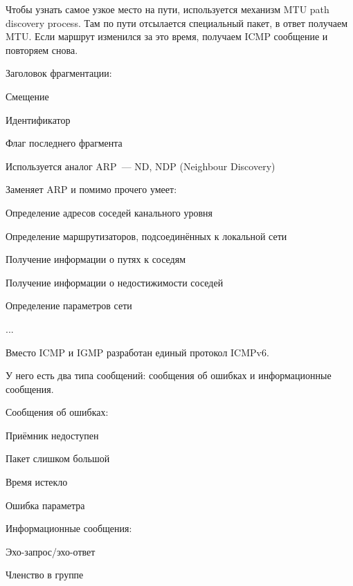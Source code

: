 Чтобы узнать самое узкое место на пути, используется механизм MTU path discovery process. Там по пути отсылается специальный пакет, в ответ получаем MTU. Если маршрут изменился за это время, получаем ICMP сообщение и повторяем снова.

Заголовок фрагментации:
\begin{MyItemize}
    \item Смещение
    \item Идентификатор
    \item Флаг последнего фрагмента
\end{MyItemize}


Используется аналог ARP~--- ND, NDP (Neighbour Discovery)

Заменяет ARP и помимо прочего умеет:
\begin{MyItemize}
    \item Определение адресов соседей канального уровня
    \item Определение маршрутизаторов, подсоединённых к локальной сети
    \item Получение информации о путях к соседям
    \item Получение информации о недостижимости соседей
    \item Определение параметров сети
    \item ...
\end{MyItemize}


Вместо ICMP и IGMP разработан единый протокол ICMPv6.

У него есть два типа сообщений: сообщения об ошибках и информационные сообщения.

Сообщения об ошибках:
\begin{MyItemize}
    \item Приёмник недоступен
    \item Пакет слишком большой
    \item Время истекло
    \item Ошибка параметра
\end{MyItemize}

Информационные сообщения:
\begin{MyItemize}
    \item Эхо-запрос/эхо-ответ
    \item Членство в группе
\end{MyItemize}

